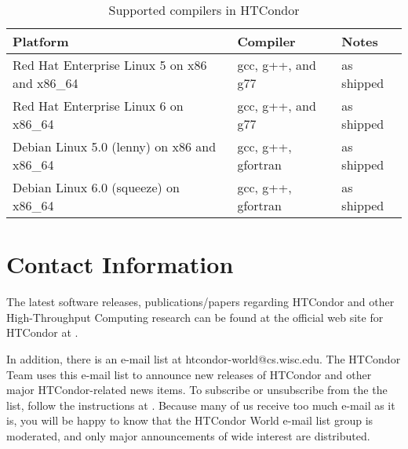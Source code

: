 
\begin{center}
\begin{table}[hbt]
\begin{tabular}{|ll|l|} \hline
\textbf{Platform} & \textbf{Compiler} & \textbf{Notes}\\ \hline \hline
Red Hat Enterprise Linux 5 on x86 and x86\_64 & gcc, g++, and g77 & as shipped  \\ 
\hline
Red Hat Enterprise Linux 6 on x86\_64 & gcc, g++, and g77 & as shipped  \\ 
\hline
Debian Linux 5.0 (lenny) on x86 and x86\_64 & gcc, g++, gfortran & as shipped \\ 
\hline
Debian Linux 6.0 (squeeze) on x86\_64 & gcc, g++, gfortran & as shipped \\ 
\hline
\end{tabular}
\caption{\label{supported-compile}Supported compilers in HTCondor \VersionNotice}
\end{table}
\end{center}

 


\section{\label{contact-info}Contact Information}

The latest software releases, publications/papers regarding HTCondor and other 
High-Throughput Computing
research can be found at the official web site for HTCondor at  
.

In addition, there is an e-mail list at htcondor-world@cs.wisc.edu.
The HTCondor Team uses this e-mail list to announce new releases of
HTCondor and other major HTCondor-related news items.
To subscribe or unsubscribe from the the list, follow the instructions at  
.
Because many of us receive 
too much e-mail as it is, you will be happy to know that the
HTCondor World e-mail list group is 
moderated, and only major announcements of wide interest are distributed.

